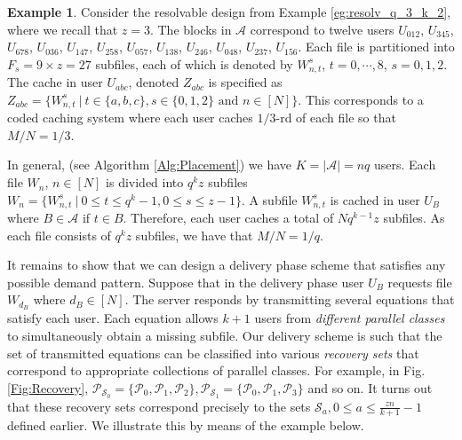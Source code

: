 \documentclass[journal,twocolumn]{IEEEtran}
\theoremstyle{definition}
\newtheorem{example}{Example}
\newcommand{\calA}{\mathcal{A}}
\newcommand{\calP}{\mathcal{P}}
\newcommand{\calS}{\mathcal{S}}
\begin{document}
\begin{example}
\label{eg:placement_q_3_k_2}
Consider the resolvable design from Example \ref{eg:resolv_q_3_k_2}, where we recall that $z=3$. The blocks in $\calA$ correspond to twelve users $U_{012}$, $U_{345}$, $U_{678}$, $U_{036}$, $U_{147}$, $U_{258}$, $U_{057}$, $U_{138}$, $U_{246}$, $U_{048}$, $U_{237}$, $U_{156}$. Each file is partitioned into $F_s=9\times z=27$ subfiles, each of which is denoted by $W_{n,t}^s$, $t=0,\cdots,8$, $s=0,1,2$. %
The cache in user $U_{abc}$, denoted $Z_{abc}$ is specified as $Z_{abc}=\{W_{n,t}^s~|~t \in \{a,b,c\}, s \in \{0,1,2\} \text{~and~} n \in [N]\}$. %
This corresponds to a coded caching system where each user caches $1/3$-rd of each file so that $M/N = 1/3$.
\end{example}

In general, (see Algorithm \ref{Alg:Placement}) we have $K = |\calA| = nq$ users. Each file $W_n$, $n\in [N]$ is divided into $q^kz$ subfiles $W_n=\{W_{n,t}^s~|~0\le t\le q^k-1,0\le s\le z-1\}$. A subfile $W_{n,t}^s$ is cached in user $U_B$ where $B \in \calA$ if $t\in B$. Therefore, each user caches a total of $Nq^{k-1}z$ subfiles. As each file consists of $q^k z$ subfiles, we have that $M/N = 1/q$.

It remains to show that we can design a delivery phase
scheme that satisfies any possible demand pattern.
Suppose that in the delivery phase user $U_B$ requests file $W_{d_{B}}$ where $d_B \in [N]$. The server responds by transmitting several equations that satisfy each user. Each equation allows $k+1$ users from {\it different parallel classes}  to simultaneously obtain a missing subfile. Our delivery scheme is such that the set of transmitted equations can be classified into various {\it recovery sets} that correspond to appropriate collections of parallel classes. For example, in Fig. \ref{Fig:Recovery}, $\calP_{\calS_0} = \{\calP_0, \calP_1, \calP_2\}, \calP_{\calS_1} = \{\calP_0, \calP_1, \calP_3\}$ and so on. It turns out that these recovery sets correspond precisely to the sets $\calS_a, 0 \leq a \leq \frac{zn}{k+1} -1$ defined earlier. We illustrate this by means of the example below.
\end{document}
